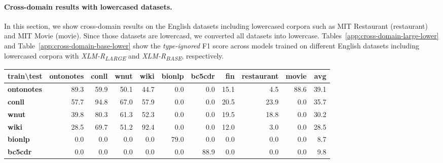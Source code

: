 \documentclass[11pt,a4paper]{article}
\begin{document}
\paragraph{Cross-domain results with lowercased datasets. }
In this section, we show cross-domain results on the English datasets including lowercased corpora such as MIT Restaurant (restaurant) and MIT Movie (movie). Since those datasets are lowercasd, we converted all datasets into lowercase.
Tables~\ref{app:cross-domain-large-lower} and Table~\ref{app:cross-domain-base-lower} show the {\it type-ignored} F1 score across models trained on different English datasets including lowercased corpora with {\it XLM-R\textsubscript{LARGE}} and {\it XLM-R\textsubscript{BASE}}, respectively.

\begin{table*}[ht]
\centering
\begin{tabular}{l|rrrrrrrrr|r}
\hline
\textbf{train\textbackslash{}test} & \textbf{ontonotes} & \textbf{conll} & \textbf{wnut} & \textbf{wiki} & \textbf{bionlp} & \textbf{bc5cdr} & \textbf{fin} & \textbf{restaurant} & \textbf{movie} & \textbf{avg} \\\hline
\textbf{ontonotes}  & 89.3               & 59.9           & 50.1          & 44.7          & 0.0               & 0.0               & 15.1         & 4.5                 & 88.6           & 39.1         \\\hline
\textbf{conll}      & 57.7               & 94.8           & 67.0          & 57.9          & 0.0               & 0.0               & 20.5         & 23.9                & 0.0              & 35.7         \\\hline
\textbf{wnut}       & 39.8               & 80.3           & 61.3          & 52.3          & 0.0               & 0.0               & 19.5         & 18.8                & 0.0              & 30.2         \\\hline
\textbf{wiki}       & 28.5               & 69.7           & 51.2          & 92.4          & 0.0               & 0.0               & 12.0           & 3.0                 & 0.0              & 28.5         \\\hline
\textbf{bionlp}     & 0.0                  & 0.0              & 0.0             & 0.0             & 79.0          & 0.0               & 0.0            & 0.0                   & 0.0              & 8.7          \\\hline
\textbf{bc5cdr}     & 0.0                  & 0.0              & 0.0             & 0.0             & 0.0               & 88.9            & 0.0            & 0.0                   & 0.0              & 9.8          \\\hline

\end{tabular}
\end{table*}
\end{document}
